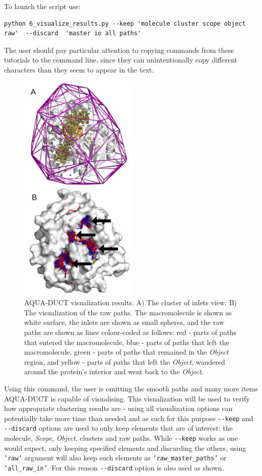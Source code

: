 \documentclass[9pt,tutorial]{livecoms}
\begin{document}
To launch the script use:
\begin{lstlisting}[columns=fullflexible]
python 6_visualize_results.py --keep 'molecule cluster scope object raw'  --discard  'master io all paths'
\end{lstlisting}
The user should pay particular attention to copying commands from these tutorials to the command line, since they can unintentionally copy different characters than they seem to appear in the text.

\begin{figure}[htp!]
\centering
\includegraphics[width=0.5\textwidth]{Tut1.1.png}
\caption{AQUA-DUCT visualization results. A) The cluster of inlets view. B) The visualization of the raw paths. The macromolecule is shown as white surface, the inlets are shown as small spheres, and the raw paths are shown as lines colour-coded as follows: red - parts of paths that entered the macromolecule, blue - parts of paths that left the macromolecule, green - parts of paths that remained in the \textit{Object} region, and yellow - parts of paths that left the \textit{Object}, wandered around the protein's interior and went back to the \textit{Object}.}
\label{Tut1.1}
\end{figure}

Using this command, the user is omitting the smooth paths and many more items AQUA-DUCT is capable of visualising. This visualization will be used to verify how appropriate clustering results are - using all visualization options can potentially take more time than needed and as such for this purpose \texttt{-{}-keep} and \texttt{-{}-discard} options are used to only keep elements that are of interest: the molecule, \textit{Scope}, \textit{Object}, clusters and raw paths. While \texttt{-{}-keep} works as one would expect, only keeping specified elements and discarding the others, using \texttt{'raw'} argument will also keep such elements as \texttt{'raw\_master\_paths'} or \texttt{'all\_raw\_in'}. For this reason \texttt{-{}-discard} option is also used as shown. 
\end{document}
